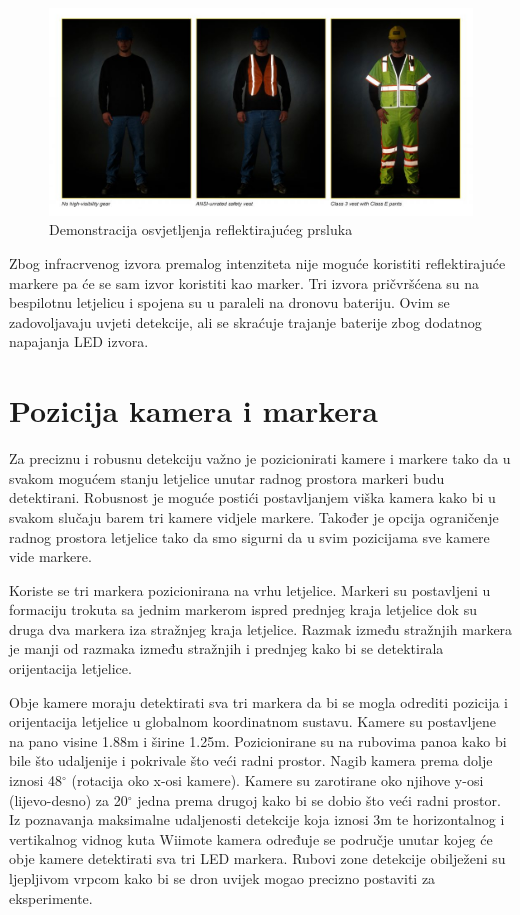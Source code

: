 \documentclass[times, utf8, diplomski]{fer}
\begin{document}
\begin{figure}[h]
\centering
\includegraphics[width=.9\textwidth]{retroreflective_vest}
\caption{Demonstracija osvjetljenja reflektirajućeg prsluka}
\label{fig:vesta}
\end{figure}

Zbog infracrvenog izvora premalog intenziteta nije moguće koristiti reflektirajuće markere pa će se sam izvor koristiti kao marker. Tri izvora pričvršćena su na bespilotnu letjelicu i spojena su u paraleli na dronovu bateriju. Ovim se zadovoljavaju uvjeti detekcije, ali se skraćuje trajanje baterije zbog dodatnog napajanja LED izvora. 

\section{Pozicija kamera i markera}
Za preciznu i robusnu detekciju važno je pozicionirati kamere i markere tako da u svakom mogućem stanju letjelice unutar radnog prostora markeri budu detektirani. Robusnost je moguće postići postavljanjem viška kamera kako bi u svakom slučaju barem tri kamere vidjele markere. Također je opcija ograničenje radnog prostora letjelice tako da smo sigurni da u svim pozicijama sve kamere vide markere. 

Koriste se tri markera pozicionirana na vrhu letjelice. Markeri su postavljeni u formaciju trokuta sa jednim markerom ispred prednjeg kraja letjelice dok su druga dva markera iza stražnjeg kraja letjelice. Razmak između stražnjih markera je manji od razmaka između stražnjih i prednjeg kako bi se detektirala orijentacija letjelice.

Obje kamere moraju detektirati sva tri markera da bi se mogla odrediti pozicija i orijentacija letjelice u globalnom koordinatnom sustavu. Kamere su postavljene na pano visine 1.88m i širine 1.25m. Pozicionirane su na rubovima panoa kako bi bile što udaljenije i pokrivale što veći radni prostor. Nagib kamera prema dolje iznosi 48$^{\circ}$ (rotacija oko x-osi kamere). Kamere su zarotirane oko njihove y-osi (lijevo-desno) za 20$^{\circ}$ jedna prema drugoj kako bi se dobio što veći radni prostor. Iz poznavanja maksimalne udaljenosti detekcije koja iznosi 3m te horizontalnog i vertikalnog vidnog kuta Wiimote kamera određuje se područje unutar kojeg će obje kamere detektirati sva tri LED markera. Rubovi zone detekcije obilježeni su ljepljivom vrpcom kako bi se dron uvijek mogao precizno postaviti za eksperimente. 
\end{document}
